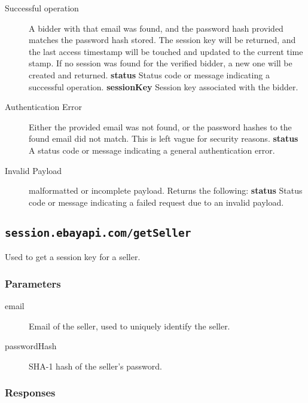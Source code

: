 \documentclass{article}
\newcommand{\code}[1]{\colorbox{light-gray}{\texttt{#1}}}
\begin{document}
\begin{description}
    \item[Successful operation] A bidder with that email was found, and the
        password hash provided matches the password hash stored. The session
        key will be returned, and the last access timestamp will be touched and
        updated to the current time stamp. If no session was found for the
        verified bidder, a new one will be created and returned.
        \subitem\textbf{status} Status code or message indicating a successful
        operation.
        \subitem\textbf{sessionKey} Session key associated with the bidder.

    \item[Authentication Error] Either the provided email was not found, or the
        password hashes to the found email did not match. This is left vague
        for security reasons.
        \subitem\textbf{status} A status code or message indicating a general
        authentication error.

    \item[Invalid Payload] malformatted or incomplete payload. Returns the
        following:
        \subitem\textbf{status} Status code or message indicating a failed
        request due to an invalid payload.
\end{description}

\subsection{\code{session.ebayapi.com/getSeller}}
Used to get a session key for a seller.

\subsubsection{Parameters}

\begin{description}
    \item[email] Email of the seller, used to uniquely identify the seller.
    \item[passwordHash] SHA-1 hash of the seller's password.
\end{description}


\subsubsection{Responses}
\end{document}
